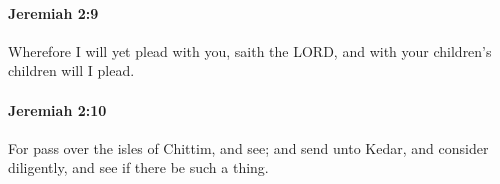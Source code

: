 		\paragraph{Jeremiah 2:9} %
			\label{JEREMIAH-2-9}

			Wherefore I will yet plead with you, saith the LORD, and with your children’s children will I plead.


		\paragraph{Jeremiah 2:10} %
			\label{JEREMIAH-2-10}

			For pass over the isles of Chittim, and see; and send unto Kedar, and consider diligently, and see if there be such a thing.


